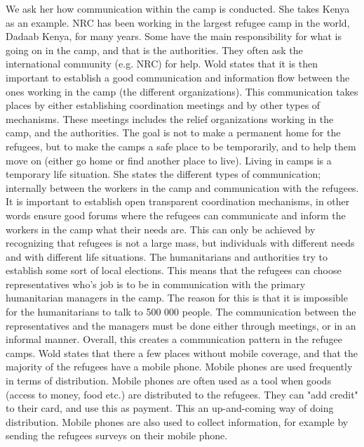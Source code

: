 We ask her how communication within the camp is conducted. She takes Kenya as an example. NRC has been working in the largest refugee camp in the world, Dadaab Kenya, for many years.  Some have the main responsibility for what is going on in the camp, and that is the  authorities. They often ask the international community (e.g. NRC) for help. Wold states that it is then important to establish a good communication and information flow between the ones working in the camp (the different organizations). This communication takes places by either establishing coordination meetings and by other types of mechanisms. These meetings includes the relief organizations working in the camp, and the authorities. The goal is not to make a permanent home for the refugees, but to make the camps a safe place to be temporarily, and to help them move on (either go home or find another place to live). Living in camps is a temporary life situation. She states the different types of communication; internally between the workers in the camp and communication with the refugees. It is important to establish open transparent coordination mechanisms, in other words ensure good forums where the refugees can communicate and inform the workers in the camp what their needs are. This can only be achieved by recognizing that refugees is not a large mass, but individuals with different needs and with different life situations. The humanitarians and authorities try to establish some sort of local elections. This means that the refugees can choose representatives who's job is to be in communication with the primary humanitarian managers in the camp. The reason for this is that it is impossible for the humanitarians to talk to 500 000 people. The communication between the representatives and the managers must be done either through meetings, or in an informal manner. Overall, this creates a communication pattern in the refugee camps. Wold states that there a few places without mobile coverage, and that the majority of the refugees have a mobile phone. Mobile phones are used frequently in terms of distribution. Mobile phones are often used as a tool when goods (access to money, food etc.) are distributed to the refugees. They can "add credit" to their card, and use this as payment. This an up-and-coming way of doing distribution. Mobile phones are also used to collect information, for example by sending the refugees surveys on their mobile phone. 


